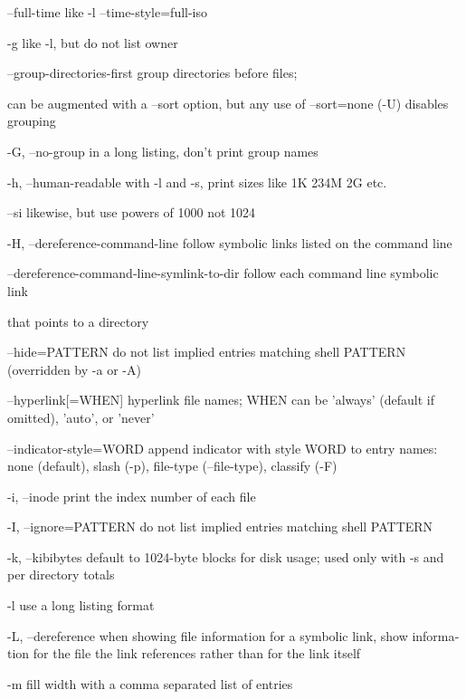 \documentclass{article}
\begin{document}
       --full-time
              like -l --time-style=full-iso

       -g     like -l, but do not list owner

       --group-directories-first
              group directories before files;

              can   be  augmented  with  a  --sort  option,  but  any  use  of
              --sort=none (-U) disables grouping

       -G, --no-group
              in a long listing, don't print group names

       -h, --human-readable
              with -l and -s, print sizes like 1K 234M 2G etc.

       --si   likewise, but use powers of 1000 not 1024

       -H, --dereference-command-line
              follow symbolic links listed on the command line

       --dereference-command-line-symlink-to-dir
              follow each command line symbolic link

              that points to a directory

       --hide=PATTERN
              do not list implied entries matching shell  PATTERN  (overridden
              by -a or -A)

       --hyperlink[=WHEN]
              hyperlink file names; WHEN can be 'always' (default if omitted),
              'auto', or 'never'

       --indicator-style=WORD
              append indicator with style WORD to entry names: none (default),
              slash (-p), file-type (--file-type), classify (-F)

       -i, --inode
              print the index number of each file

       -I, --ignore=PATTERN
              do not list implied entries matching shell PATTERN

       -k, --kibibytes
              default  to  1024-byte  blocks for disk usage; used only with -s
              and per directory totals

       -l     use a long listing format

       -L, --dereference
              when showing file information for a symbolic link, show informa‐
              tion  for  the file the link references rather than for the link
              itself

       -m     fill width with a comma separated list of entries
\end{document}
